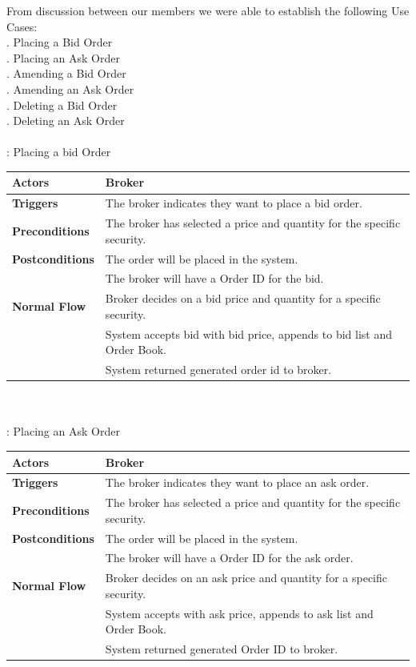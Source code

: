 \documentclass[a4paper]{article}
\begin{document}
From discussion between our members we were able to establish the following Use Cases: \\
\indent{}. Placing a Bid Order	\\
\indent{}. Placing an Ask Order 	\\	
\indent{}. Amending a Bid Order 	\\
\indent{}. Amending an Ask Order \\	
\indent{}. Deleting a Bid Order	\\
\indent{}. Deleting an Ask Order 	\\ 
\\


: Placing a bid Order \\
    \begin{tabular}{ | l | p{10cm} |}
    \hline
    	{\bf Actors} & Broker \\\hline
	{\bf Triggers} & The broker indicates they want to place a bid order. \\\hline
	{\bf Preconditions} & The broker has selected a price and quantity for the specific security. \\\hline
	{\bf Postconditions} & The order will be placed in the system. \\
	& The broker will have a Order ID for the bid. \\\hline
	{\bf Normal Flow} & Broker decides on a bid price and quantity for a specific security. \\
	& System accepts bid with bid price, appends to bid list and Order Book. \\
	& System returned generated order id to broker. \\\hline
    \end{tabular} \\\\

: Placing an Ask Order \\ 
\begin{tabular}{ | l | p{10cm} |}\hline
	{\bf Actors} & Broker \\\hline
	{\bf Triggers} & The broker indicates they want to place an ask order.  \\\hline
	{\bf Preconditions} & The broker has selected a price and quantity for the specific security. \\\hline
	{\bf Postconditions} & The order will be placed in the system.  \\
	& The broker will have a Order ID for the ask order. \\\hline
	{\bf Normal Flow} & Broker decides on an ask price and quantity for a specific security. \\
	& System accepts with ask price, appends to ask list and Order Book. \\
	& System returned generated Order ID to broker. \\\hline
\end{tabular} \\\\
\end{document}
